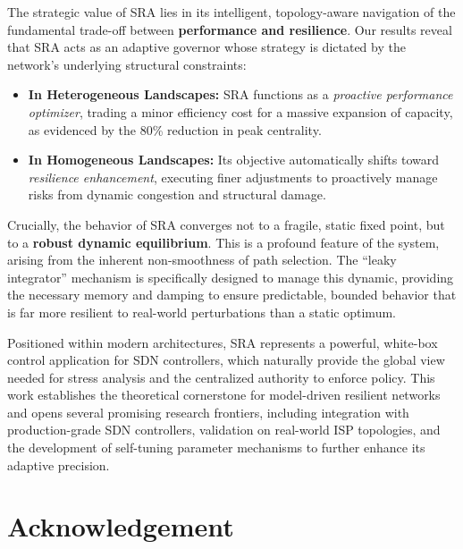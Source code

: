\documentclass{ccjnl}
\begin{document}
The strategic value of SRA lies in its intelligent, topology-aware navigation of the fundamental trade-off between \textbf{performance and resilience}. 
Our results reveal that SRA acts as an adaptive governor whose strategy is dictated by the network’s underlying structural constraints:
\begin{itemize}
    \item \textbf{In Heterogeneous Landscapes:} SRA functions as a \textit{proactive performance optimizer}, trading a minor efficiency cost for a massive expansion of capacity, as evidenced by the 80\% reduction in peak centrality.
    \item \textbf{In Homogeneous Landscapes:} Its objective automatically shifts toward \textit{resilience enhancement}, executing finer adjustments to proactively manage risks from dynamic congestion and structural damage.
\end{itemize}

Crucially, the behavior of SRA converges not to a fragile, static fixed point, but to a \textbf{robust dynamic equilibrium}. 
This is a profound feature of the system, arising from the inherent non-smoothness of path selection. 
The ``leaky integrator'' mechanism is specifically designed to manage this dynamic, providing the necessary memory and damping to ensure predictable, bounded behavior that is far more resilient to real-world perturbations than a static optimum.

Positioned within modern architectures, SRA represents a powerful, white-box control application for SDN controllers, which naturally provide the global view needed for stress analysis and the centralized authority to enforce policy. 
This work establishes the theoretical cornerstone for model-driven resilient networks and opens several promising research frontiers, including integration with production-grade SDN controllers, validation on real-world ISP topologies, and the development of self-tuning parameter mechanisms to further enhance its adaptive precision.

\section*{Acknowledgement}


\appendix
\setcounter{section}{0}
\setcounter{equation}{0}
\renewcommand{\thesection}{\Alph{section}}
\renewcommand{\theequation}{\thesection.\arabic{equation}}
\renewcommand{\theHsection}{appendix.\Alph{section}}
\end{document}
